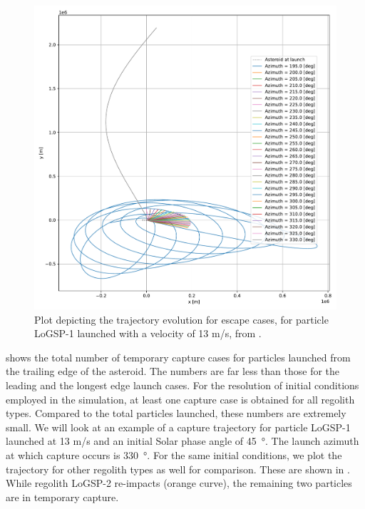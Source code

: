 \begin{figure}[htb]
\centering
\captionsetup{justification=centering}
\includegraphics[width=\textwidth, height=0.4\textheight, keepaspectratio=true]{trailing_edge_perturbations/logsp1_escape_traj_13ms_solarPhase225.pdf}
\caption{Plot depicting the trajectory evolution for escape cases, for particle LoGSP-1 launched with a velocity of 13 m/s, from \protect{}.}
\label{fig:trailingEdge_logsp1_escape_traj_13ms_solar225}
\end{figure}
\FloatBarrier
 shows the total number of temporary capture cases for particles launched from the trailing edge of the asteroid. The numbers are far less than those for the leading and the longest edge launch cases. For the resolution of initial conditions employed in the simulation, at least one capture case is obtained for all regolith types. Compared to the total particles launched, these numbers are extremely small. We will look at an example of a capture trajectory for particle LoGSP-1 launched at 13 m/s and an initial Solar phase angle of \SI{45}{\degree}. The launch azimuth at which capture occurs is \SI{330}{\degree}. For the same initial conditions, we plot the trajectory for other regolith types as well for comparison. These are shown in . While regolith LoGSP-2 re-impacts (orange curve), the remaining two particles are in temporary capture.
